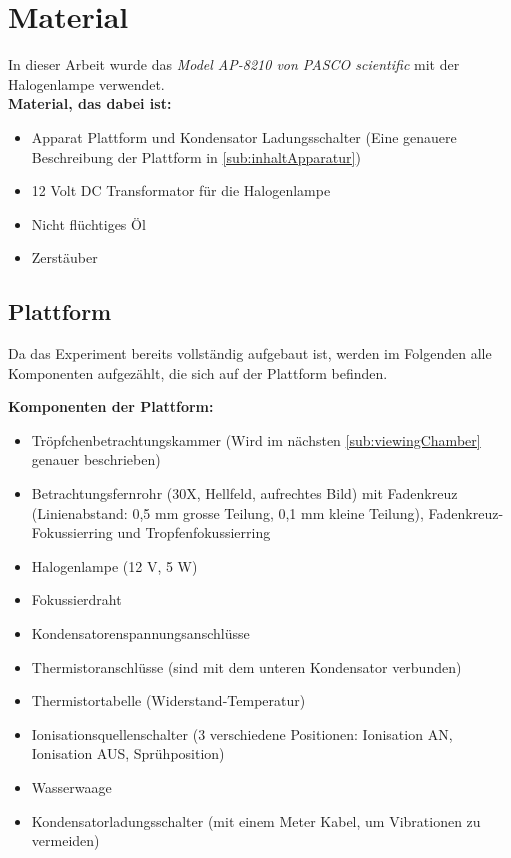 \section{Material}\label{sec:material}

In dieser Arbeit wurde das \textit{Model AP-8210 von PASCO scientific} mit der Halogenlampe verwendet. \\

\noindent \textbf{Material, das dabei ist:}

\begin{itemize}
	\item Apparat Plattform und Kondensator Ladungsschalter (Eine genauere Beschreibung der Plattform in \autoref{sub:inhaltApparatur})
	\item 12 Volt DC Transformator für die Halogenlampe
	\item Nicht flüchtiges Öl
	\item Zerstäuber
\end{itemize}

\subsection{Plattform}\label{sub:inhaltApparatur}
Da das Experiment bereits vollständig aufgebaut ist, werden im Folgenden alle Komponenten aufgezählt, die sich auf der Plattform befinden.

\noindent \textbf{Komponenten der Plattform:}

\begin{itemize}\label{item:apparatur}
	\item Tröpfchenbetrachtungskammer (Wird im nächsten \autoref{sub:viewingChamber} genauer beschrieben)
	\item Betrachtungsfernrohr (30X, Hellfeld, aufrechtes Bild) mit Fadenkreuz (Linienabstand: 0,5 mm grosse Teilung, 0,1 mm kleine Teilung), Fadenkreuz-Fokussierring und Tropfenfokussierring
	\item Halogenlampe (12 V, 5 W)
	\item Fokussierdraht
	\item Kondensatorenspannungsanschlüsse
	\item Thermistoranschlüsse (sind mit dem unteren Kondensator verbunden)
	\item Thermistortabelle (Widerstand-Temperatur)
	\item Ionisationsquellenschalter (3 verschiedene Positionen: Ionisation AN, Ionisation AUS, Sprühposition)
	\item Wasserwaage
	\item Kondensatorladungsschalter (mit einem Meter Kabel, um Vibrationen zu vermeiden)
\end{itemize}


